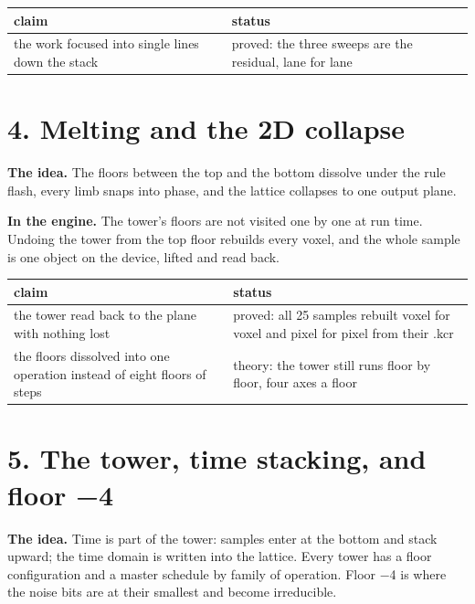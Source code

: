 {\small
\setlength{\tabcolsep}{6pt}
\begin{longtable}{>{\RaggedRight\arraybackslash}p{}>{\RaggedRight\arraybackslash}p{}}
\toprule
claim & status \\
\midrule
\endhead
the work focused into single lines down the stack & proved: the three sweeps are the residual, lane for lane \\
\bottomrule
\end{longtable}
}

\section{\texorpdfstring{4. Melting and the 2D collapse}{4. Melting and the 2D collapse}}

\textbf{The idea.} The floors between the top and the bottom dissolve under the rule flash, every limb snaps into phase, and the lattice collapses to one output plane.

\textbf{In the engine.} The tower's floors are not visited one by one at run time. Undoing the tower from the top floor rebuilds every voxel, and the whole sample is one object on the device, lifted and read back.

{\small
\setlength{\tabcolsep}{6pt}
\begin{longtable}{>{\RaggedRight\arraybackslash}p{}>{\RaggedRight\arraybackslash}p{}}
\toprule
claim & status \\
\midrule
\endhead
the tower read back to the plane with nothing lost & proved: all 25 samples rebuilt voxel for voxel and pixel for pixel from their .kcr \\
the floors dissolved into one operation instead of eight floors of steps & theory: the tower still runs floor by floor, four axes a floor \\
\bottomrule
\end{longtable}
}

\section{\texorpdfstring{5. The tower, time stacking, and floor −4}{5. The tower, time stacking, and floor −4}}

\textbf{The idea.} Time is part of the tower: samples enter at the bottom and stack upward; the time domain is written into the lattice. Every tower has a floor configuration and a master schedule by family of operation. Floor −4 is where the noise bits are at their smallest and become irreducible.

